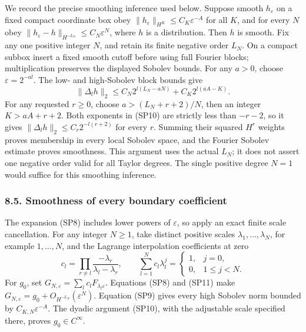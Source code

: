 \documentclass[
  11pt,
]{article}
\begin{document}
We record the precise smoothing inference used below. Suppose smooth
\(h_\varepsilon\) on a fixed compact coordinate box obey
\(\|h_\varepsilon\|_{H^K}\le C_K\varepsilon^{-A}\) for all \(K\), and
for every \(N\) obey \(\|h_\varepsilon-h\|_{H^{-L_N}}
\le C_N\varepsilon^N\), where \(h\) is a distribution. Then \(h\) is
smooth. Fix any one positive integer \(N\), and retain its finite
negative order \(L_N\). On a compact subbox insert a fixed smooth cutoff
before using full Fourier blocks; multiplication preserves the displayed
Sobolev bounds. For any \(a>0\), choose \(\varepsilon=2^{-al}\). The
low- and high-Sobolev block bounds give \[
 \|\Delta_l h\|_2
 \le C_N 2^{l(L_N-aN)}
           +C_K2^{l(aA-K)}.
 \tag{SP10}
\] For any requested \(r\ge0\), choose \(a>(L_N+r+2)/N\), then an
integer \(K>aA+r+2\). Both exponents in (SP10) are strictly less than
\(-r-2\), so it gives \(\|\Delta_l h\|_2\le C_r2^{-l(r+2)}\) for every
\(r\). Summing their squared \(H^r\) weights proves membership in every
local Sobolev space, and the Fourier Sobolev estimate proves smoothness.
This argument uses the actual \(L_N\); it does not assert one negative
order valid for all Taylor degrees. The single positive degree \(N=1\)
would suffice for this smoothing inference.

\subsubsection{8.5. Smoothness of every boundary
coefficient}\label{smoothness-of-every-boundary-coefficient}

The expansion (SP8) includes lower powers of \(\varepsilon\), so apply
an exact finite scale cancellation. For any integer \(N\ge1\), take
distinct positive scales \(\lambda_1,\ldots,\lambda_N\), for example
\(1,\ldots,N\), and the Lagrange interpolation coefficients at zero \[
 c_l=\prod_{r\ne l}
          \frac{-\lambda_r}{\lambda_l-\lambda_r},
 \qquad
 \sum_{l=1}^{N}c_l\lambda_l^j
          =\begin{cases}1,&j=0,\\0,&1\le j<N.
            \end{cases}
 \tag{SP11}
\] For \(g_0\), set
\(G_{N,\varepsilon}=\sum_lc_lF_{\lambda_l\varepsilon}\). Equations (SP8)
and (SP11) make \(G_{N,\varepsilon}=g_0+O_{H^{-L_N}}(\varepsilon^N)\).
Equation (SP9) gives every high Sobolev norm bounded by
\(C_{K,N}\varepsilon^{-A}\). The dyadic argument (SP10), with the
adjustable scale specified there, proves \(g_0\in C^\infty\).
\end{document}
